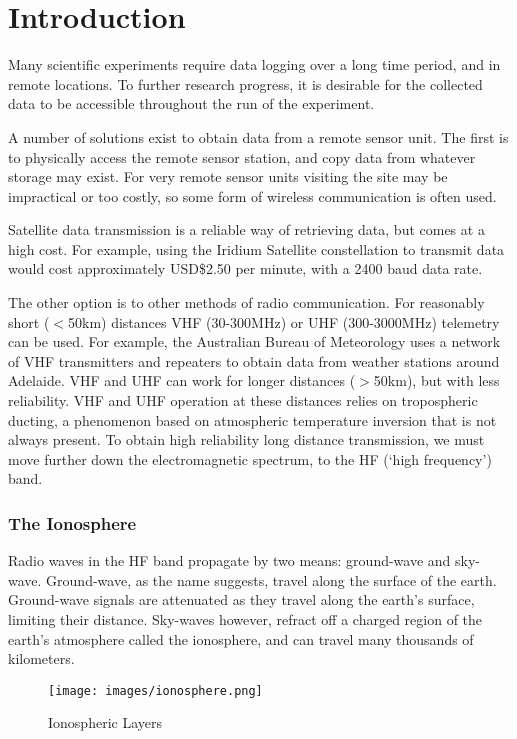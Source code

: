 \documentclass[a4paper,12pt]{article}
\begin{document}
\section{Introduction}
Many scientific experiments require data logging over a long time period, and in remote locations. To further research progress, it is desirable for the collected data to be accessible throughout the run of the experiment.

A number of solutions exist to obtain data from a remote sensor unit. The first is to physically access the remote sensor station, and copy data from whatever storage may exist. For very remote sensor units visiting the site may be impractical or too costly, so some form of wireless communication is often used. 

Satellite data transmission is a reliable way of retrieving data, but comes at a high cost. For example, using the Iridium Satellite constellation to transmit data would cost approximately USD\$2.50 per minute, with a 2400 baud data rate\citep{ref:iridium}.

The other option is to other methods of radio communication. For reasonably short ($<$50km) distances VHF (30-300MHz) or UHF (300-3000MHz) telemetry can be used. For example, the Australian Bureau of Meteorology uses a network of VHF transmitters\citep{ref:bomtx} and repeaters to obtain data from weather stations around Adelaide. VHF and UHF can work for longer distances ($>$50km), but with less reliability. VHF and UHF operation at these distances relies on tropospheric ducting, a phenomenon based on atmospheric temperature inversion that is not always present. To obtain high reliability long distance transmission, we must move further down the electromagnetic spectrum, to the HF (`high frequency') band.

\subsubsection*{The Ionosphere}

Radio waves in the HF band propagate by two means: ground-wave and sky-wave. Ground-wave, as the name suggests, travel along the surface of the earth. Ground-wave signals are attenuated as they travel along the earth's surface, limiting their distance. Sky-waves however, refract off a charged region of the earth's atmosphere called the ionosphere, and can travel many thousands of kilometers.

\begin{figure}[h]
  \begin{center}
    \texttt{[image: images/ionosphere.png]}
  \end{center}
  \caption{Ionospheric Layers}
  \label{fig:ionosphere}
\end{figure}
\end{document}
